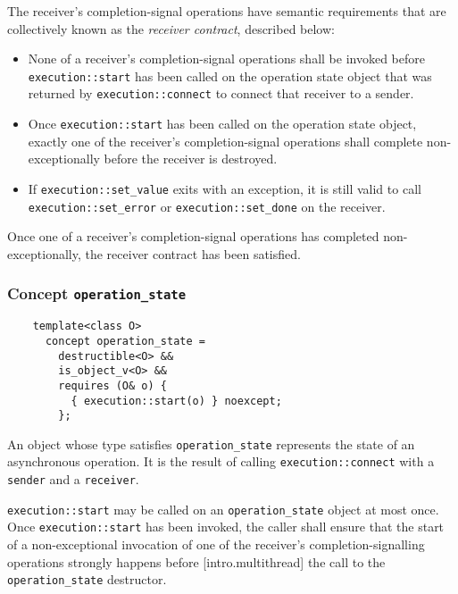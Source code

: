 \documentclass[a4paper,12pt,notitlepage,twoside,openright]{article}
\begin{document}
The receiver's completion-signal operations have semantic requirements
that are collectively known as the \emph{receiver contract}, described
below:

\begin{itemize}
\item
  None of a receiver's completion-signal operations shall be invoked
  before \texttt{execution::start} has been called on the
  operation state object that was returned by
  \texttt{execution::connect} to connect that receiver to a
  sender.
\item
  Once \texttt{execution::start} has been called on the
  operation state object, exactly one of the receiver's
  completion-signal operations shall complete non-exceptionally before
  the receiver is destroyed.
\item
  If \texttt{execution::set_value} exits with an exception,
  it is still valid to call \texttt{execution::set_error} or
  \texttt{execution::set_done} on the receiver.
\end{itemize}

Once one of a receiver's completion-signal operations has completed
non-exceptionally, the receiver contract has been satisfied.

\hypertarget{concept-operation_state}{%
\subsubsection{\texorpdfstring{Concept
\texttt{operation_state}}{Concept }}\label{concept-operation_state}}

\begin{verbatim}
    template<class O>
      concept operation_state =
        destructible<O> &&
        is_object_v<O> &&
        requires (O& o) {
          { execution::start(o) } noexcept;
        };
\end{verbatim}

An object whose type satisfies \texttt{operation_state}
represents the state of an asynchronous operation. It is the result of
calling \texttt{execution::connect} with a
\texttt{sender} and a \texttt{receiver}.

\texttt{execution::start} may be called on an
\texttt{operation_state} object at most once. Once
\texttt{execution::start} has been invoked, the caller shall
ensure that the start of a non-exceptional invocation of one of the
receiver's completion-signalling operations strongly happens before
{[}intro.multithread{]} the call to the
\texttt{operation_state} destructor.
\end{document}
